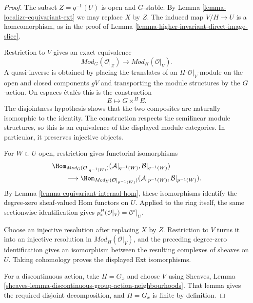 \begin{proof}
The subset $Z=q^{-1}(U)$ is open and $G$-stable. By Lemma
\ref{lemma-localize-equivariant-ext} we may replace $X$ by $Z$. The induced
map $V/H\to U$ is a homeomorphism, as in the proof of Lemma
\ref{lemma-higher-invariant-direct-image-slice}.

Restriction to $V$ gives an exact equivalence
$$
\textit{Mod}_G(\mathcal O|_Z)
\longrightarrow
\textit{Mod}_H(\mathcal O|_V).
$$
A quasi-inverse is obtained by placing the translates of an
$H$-$\mathcal O|_V$-module on the open and closed components $gV$ and
transporting the module structures by the $G$-action. On espaces
\'etal\'es this is the construction
$$
E\longmapsto G\mathbin{\times^H}E.
$$
The disjointness hypothesis shows that the two composites are naturally
isomorphic to the identity. The construction respects the semilinear module
structures, so this is an equivalence of the displayed module categories.
In particular, it preserves injective objects.

For $W\subset U$ open, restriction gives functorial isomorphisms
$$
\begin{aligned}
&\Hom_{\textit{Mod}_G(\mathcal O|_{q^{-1}(W)})}
(\mathcal A|_{q^{-1}(W)},\mathcal B|_{q^{-1}(W)})\\
&\qquad\longrightarrow
\Hom_{\textit{Mod}_H(\mathcal O|_{p^{-1}(W)})}
(\mathcal A|_{p^{-1}(W)},\mathcal B|_{p^{-1}(W)}).
\end{aligned}
$$
By Lemma \ref{lemma-equivariant-internal-hom}, these isomorphisms identify
the degree-zero sheaf-valued Hom functors on $U$. Applied to the ring itself,
the same sectionwise identification gives
$p_*^H(\mathcal O|_V)=\mathcal O'|_U$.

Choose an injective resolution after replacing $X$ by $Z$. Restriction to
$V$ turns it into an injective resolution in
$\textit{Mod}_H(\mathcal O|_V)$, and the preceding degree-zero
identification gives an isomorphism between the resulting complexes of
sheaves on $U$. Taking cohomology proves the displayed Ext isomorphisms.

For a discontinuous action, take $H=G_x$ and choose $V$ using Sheaves,
Lemma \ref{sheaves-lemma-discontinuous-group-action-neighbourhoods}. That
lemma gives the required disjoint decomposition, and $H=G_x$ is finite by
definition.
\end{proof}


